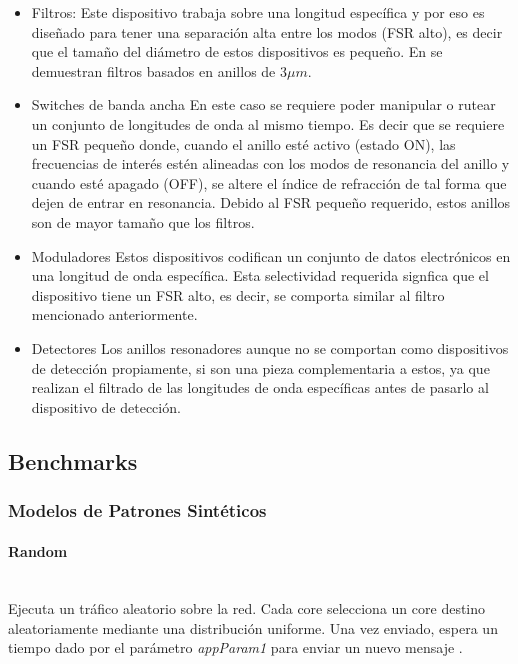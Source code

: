 \begin{itemize}
\item Filtros:
Este dispositivo trabaja sobre una longitud específica y por eso es diseñado 
para tener una separación alta entre los modos (FSR alto), es decir que el 
tamaño del diámetro de estos dispositivos es pequeño. En \cite{little1998ultra} 
se demuestran filtros basados en anillos de $3\mu m$.

\item Switches de banda ancha
En este caso se requiere poder manipular o rutear un conjunto de longitudes
de onda al mismo tiempo. Es decir que se requiere un FSR pequeño donde, cuando
el anillo esté activo (estado ON), las frecuencias de interés estén alineadas con los
modos de resonancia del anillo y cuando esté apagado (OFF), se altere el índice
de refracción de tal forma que dejen de entrar en resonancia.
Debido al FSR pequeño requerido, estos anillos son de mayor tamaño que los filtros.

\item Moduladores
Estos dispositivos codifican un conjunto de datos electrónicos en
una longitud de onda específica. Esta selectividad requerida signfica
que el dispositivo tiene un FSR alto, es decir, se comporta similar
al filtro mencionado anteriormente.

\item Detectores
Los anillos resonadores aunque no se comportan como dispositivos de detección
propiamente, si son una pieza complementaria a estos, ya que realizan 
el filtrado de las longitudes de onda específicas antes de pasarlo
al dispositivo de detección.

\end{itemize}  


\subsection{Benchmarks}
\subsubsection{Modelos de Patrones Sintéticos}
\label{sss:synthetic}

\paragraph{Random}~\\
Ejecuta un tráfico aleatorio sobre la red. Cada core selecciona un core destino aleatoriamente
mediante una distribución uniforme. Una vez enviado, espera un tiempo dado por el parámetro
\textit{appParam1} para enviar un nuevo mensaje \cite{Manual}.

